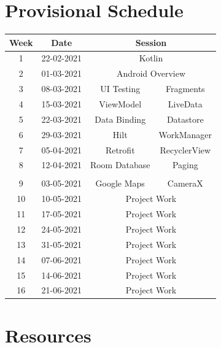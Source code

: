 \documentclass{article}
\begin{document}
\section*{Provisional Schedule}
\renewcommand{\arraystretch}{1.5}
\begin{tabular}{|c|c|c|c|}
	\hline
	\textbf{Week} & \textbf{Date}     & \multicolumn{2}{c|}{\textbf{Session}}          \\ \hline
	\small 1 & \small 22-02-2021 & \multicolumn{2}{c|}{Kotlin} 								\\ \hline
	\small 2 & \small 01-03-2021 & \multicolumn{2}{c|}{Android Overview}  \\ \hline
	\small 3 & \small 08-03-2021 & UI Testing      & Fragments        \\ \hline
	\small 4 & \small 15-03-2021 & ViewModel                     & LiveData       \\ \hline
	\small 5 & \small 22-03-2021 & Data Binding         & Datastore   \\ \hline
	\small 6 & \small 29-03-2021 & Hilt     & WorkManager       \\ \hline
	\small 7 & \small 05-04-2021 & Retrofit   & RecyclerView         \\ \hline
	\small 8 & \small 12-04-2021 & Room Database & Paging   \\ \hline
	\rowcolor{yellow} \multicolumn{4}{|c|}{\small Mid Term Break}  \\ \hline
	\small 9 & \small 03-05-2021 & Google Maps & CameraX     \\ \hline
	\small 10     & \small 10-05-2021 & \multicolumn{2}{c|}{Project Work}        \\ \hline
	\small 11     & \small 17-05-2021 & \multicolumn{2}{c|}{Project Work}       \\ \hline
	\small 12     & \small 24-05-2021 & \multicolumn{2}{c|}{Project Work}       \\ \hline
	\small 13     & \small 31-05-2021 & \multicolumn{2}{c|}{Project Work}       \\ \hline
	\small 14     & \small 07-06-2021 & \multicolumn{2}{c|}{Project Work}       \\ \hline
	\small 15     & \small 14-06-2021 & \multicolumn{2}{c|}{Project Work}       \\ \hline
	\small 16     & \small 21-06-2021 & \multicolumn{2}{c|}{Project Work}       \\ \hline
\end{tabular}

\section*{Resources}
\end{document}
